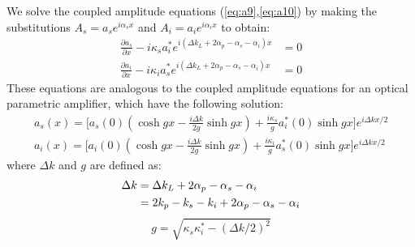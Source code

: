 We solve the coupled amplitude equations (\ref{eq:a9},\ref{eq:a10}) by making the substitutions $A_s=a_s e^{i\alpha_s x}$ and $A_i=a_i e^{i\alpha_i x}$ to obtain:
\begin{align}
\frac{{\partial {a_s}}}{{\partial x}} - i{\kappa _s}a_i^*{e^{i(\Delta {k_L} + 2{\alpha _p} - {\alpha _s} - {\alpha _i})x}} &= 0 \label{eq:a17} \\
\frac{{\partial {a_i}}}{{\partial x}} - i{\kappa _i}a_s^*{e^{i(\Delta {k_L} + 2{\alpha _p} - {\alpha _s} - {\alpha _i})x}} &= 0 \label{eq:a18}
\end{align}
These equations are analogous to the coupled amplitude equations for an optical parametric amplifier, which have the following solution\cite{armstrong_interactions_1962}:
\begin{align}
a_s(x) = \Biggl[ a_s(0)\left(\cosh gx - \frac{i\Delta k}{2g}\sinh gx \right) + \frac{i\kappa_s}{g}a_i^*(0)\sinh gx \Biggr] e^{i\Delta kx/2} \label{eq:a19}\\
a_i(x) = \Biggl[ a_i(0)\left(\cosh gx - \frac{i\Delta k}{2g}\sinh gx \right) +  \frac{i\kappa_i}{g}a_s^*(0)\sinh gx \Biggr] e^{i\Delta kx/2} \label{eq:a20}
\end{align}
where $\Delta k$ and $g$ are defined as:
\begin{align}
\Delta k &= \Delta {k_L} + 2{\alpha _p} - {\alpha _s} - {\alpha _i} \notag \\
&= 2k_p-k_s-k_i + 2{\alpha _p} - {\alpha _s} - {\alpha _i}  \label{eq:a21}
\end{align}
\begin{equation}
g=\sqrt{\kappa_s \kappa^*_i -(\Delta k/2)^2}  \label{eq:a22}
\end{equation}














